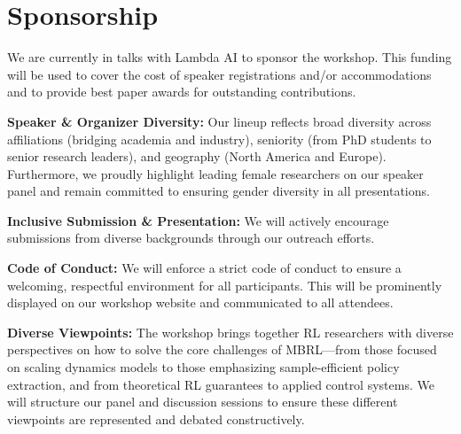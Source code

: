 \documentclass[10pt]{article} %
\begin{document}
\section{Sponsorship}

We are currently in talks with Lambda AI to sponsor the workshop. This funding will be used to cover the cost of speaker registrations and/or accommodations and to provide best paper awards for outstanding contributions.

\textbf{Speaker \& Organizer Diversity:} Our lineup reflects broad diversity across affiliations (bridging academia and industry), seniority (from PhD students to senior research leaders), and geography (North America and Europe). Furthermore, we proudly highlight leading female researchers on our speaker panel and remain committed to ensuring gender diversity in all presentations.

\textbf{Inclusive Submission \& Presentation:} We will actively encourage submissions from diverse backgrounds through our outreach efforts.

\textbf{Code of Conduct:} We will enforce a strict code of conduct to ensure a welcoming, respectful environment for all participants. This will be prominently displayed on our workshop website and communicated to all attendees.

\textbf{Diverse Viewpoints:} The workshop brings together RL researchers with diverse perspectives on how to solve the core challenges of MBRL---from those focused on scaling dynamics models to those emphasizing sample-efficient policy extraction, and from theoretical RL guarantees to applied control systems. We will structure our panel and discussion sessions to ensure these different viewpoints are represented and debated constructively.


\clearpage



\end{document}

